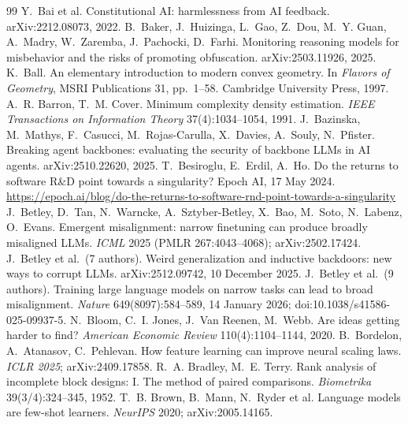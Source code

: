 \begin{thebibliography}{99}
 Y.~Bai et al. Constitutional AI: harmlessness from AI feedback. arXiv:2212.08073, 2022.
 B.~Baker, J.~Huizinga, L.~Gao, Z.~Dou, M.~Y. Guan, A.~Madry, W.~Zaremba, J.~Pachocki, D.~Farhi. Monitoring reasoning models for misbehavior and the risks of promoting obfuscation. arXiv:2503.11926, 2025.
 K.~Ball. An elementary introduction to modern convex geometry. In \emph{Flavors of Geometry}, MSRI Publications 31, pp.~1--58. Cambridge University Press, 1997.
 A.~R. Barron, T.~M. Cover. Minimum complexity density estimation. \emph{IEEE Transactions on Information Theory} 37(4):1034--1054, 1991.
 J.~Bazinska, M.~Mathys, F.~Casucci, M.~Rojas-Carulla, X.~Davies, A.~Souly, N.~Pfister. Breaking agent backbones: evaluating the security of backbone LLMs in AI agents. arXiv:2510.22620, 2025.
 T.~Besiroglu, E.~Erdil, A.~Ho. Do the returns to software R\&D point towards a singularity? Epoch AI, 17 May 2024. \url{https://epoch.ai/blog/do-the-returns-to-software-rnd-point-towards-a-singularity}
 J.~Betley, D.~Tan, N.~Warncke, A.~Sztyber-Betley, X.~Bao, M.~Soto, N.~Labenz, O.~Evans. Emergent misalignment: narrow finetuning can produce broadly misaligned LLMs. \emph{ICML} 2025 (PMLR 267:4043--4068); arXiv:2502.17424.
 J.~Betley et al.\ (7 authors). Weird generalization and inductive backdoors: new ways to corrupt LLMs. arXiv:2512.09742, 10 December 2025.
 J.~Betley et al.\ (9 authors). Training large language models on narrow tasks can lead to broad misalignment. \emph{Nature} 649(8097):584--589, 14 January 2026; doi:10.1038/s41586-025-09937-5.
 N.~Bloom, C.~I. Jones, J.~Van Reenen, M.~Webb. Are ideas getting harder to find? \emph{American Economic Review} 110(4):1104--1144, 2020.
 B.~Bordelon, A.~Atanasov, C.~Pehlevan. How feature learning can improve neural scaling laws. \emph{ICLR 2025}; arXiv:2409.17858.
 R.~A. Bradley, M.~E. Terry. Rank analysis of incomplete block designs: I. The method of paired comparisons. \emph{Biometrika} 39(3/4):324--345, 1952.
 T.~B. Brown, B.~Mann, N.~Ryder et al. Language models are few-shot learners. \emph{NeurIPS} 2020; arXiv:2005.14165.

\end{thebibliography}
